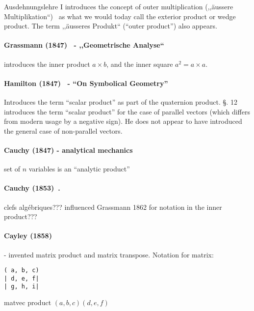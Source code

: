 Ausdehnungslehre I introduces the concept of outer multiplication (,,äussere Multiplikation``)~\cite[\S 34, p.57]{Grassmann1844}\cite[p. 81]{Grassmann1995} as what we would today call the exterior product or wedge product. The term ,,äusseres Produkt``\cite[\S 36, p. 60]{Grassmann1844} (``outer product''\cite[p. 84]{Grassmann1995}) also appears.

\paragraph{Grassmann (1847)~\cite{Grassmann1847,Grassmann1995} - ,,Geometrische Analyse``}

\cite[\S 7, p. 334]{Grassmann1995} introduces the inner product $a \times b$, and the inner square $a^2 = a \times a$.

\paragraph{Hamilton (1847)~\cite{Hamilton1847} - ``On Symbolical Geometry''}

Introduces the term ``scalar product'' as part of the quaternion product. \S. 12 introduces the term ``scalar product'' for the case of parallel vectors (which differs from modern usage by a negative sign). He does not appear to have introduced the general case of non-parallel vectors.

\paragraph{Cauchy (1847) - analytical mechanics}

set of $n$ variables is an ``analytic product''

\paragraph{Cauchy (1853)~\cite{Cauchy1853}.} clefs algébriques??? influenced Grassmann 1862 for notation in the inner product???

\paragraph{Cayley (1858)~\cite{Cayley1858}} - invented matrix product and matrix transpose.
Notation for matrix:
\begin{verbatim}
( a, b, c)
| d, e, f|
| g, h, i|
\end{verbatim}

matvec product $(a, b, c)\!\!(d, e, f)$


